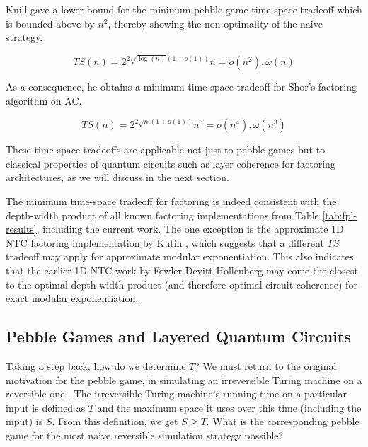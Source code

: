 Knill gave a lower bound for the minimum pebble-game time-space tradeoff
\cite{Knill1995} which is bounded above by $n^2$, thereby showing the
non-optimality of the naive strategy.

\begin{equation}
TS(n) = 2^{2\sqrt{\log(n)}(1 + o(1))}n = o(n^2), \omega(n)
\end{equation}

As a consequence, he obtains a minimum time-space tradeoff for
Shor's factoring algorithm on \textsf{AC}.

\begin{equation}
TS(n) = 2^{2\sqrt{n}(1 + o(1))}n^3 = o(n^4), \omega(n^3)
\end{equation}

These time-space tradeoffs are applicable not just to
pebble games but to classical properties of quantum
circuits such as layer coherence for factoring
architectures, as we will discuss in the  next section.

The minimum time-space tradeoff for factoring is indeed consistent with the depth-width product of all known
factoring implementations from Table \ref{tab:fpl-results}, including
the current work. The one exception is the approximate 1D NTC factoring
implementation by Kutin \cite{Kutin2006}, which suggests that a different
$TS$ tradeoff may apply for approximate modular exponentiation.
This also indicates that the earlier 1D NTC work by Fowler-Devitt-Hollenberg
\cite{Fowler2004} may come the closest to the optimal depth-width product
(and therefore optimal circuit coherence) for
exact modular exponentiation.

\subsection{Pebble Games and Layered Quantum Circuits}
\label{subsec:cohere-pebble-lqc}

Taking a step back, how do we determine $T$? We must return to the original
motivation for the pebble game, in simulating an irreversible Turing machine
on a reversible one \cite{Bennett1989}. The irreversible Turing machine's
running time on a particular input is defined as $T$ and the maximum
space it uses over this time (including the input) is $S$. From this definition,
we get $S \ge T$. What is the corresponding pebble game for the most naive
reversible simulation strategy possible?


